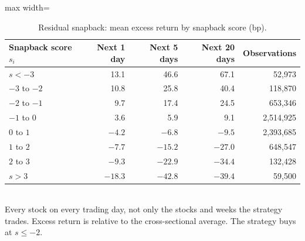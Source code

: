 \documentclass[11pt,letterpaper]{article}
\begin{document}
\begin{table}[!htbp]
    \centering
    \caption{Residual snapback: mean excess return by snapback score (bp).}
    \label{tab:calibration-snap}
    \begin{adjustbox}{max width=\linewidth}
        \begin{tabular}{lrrrr}
            \toprule
            Snapback score $s_i$ & Next 1 day & Next 5 days & Next 20 days & Observations \\
            \midrule
            $s < -3$ & 13.1 & 46.6 & 67.1 & 52,973 \\
            $-3$ to $-2$ & 10.8 & 25.8 & 40.4 & 118,870 \\
            $-2$ to $-1$ & 9.7 & 17.4 & 24.5 & 653,346 \\
            $-1$ to $0$ & 3.6 & 5.9 & 9.1 & 2,514,925 \\
            $0$ to $1$ & $-4.2$ & $-6.8$ & $-9.5$ & 2,393,685 \\
            $1$ to $2$ & $-7.7$ & $-15.2$ & $-27.0$ & 648,547 \\
            $2$ to $3$ & $-9.3$ & $-22.9$ & $-34.4$ & 132,428 \\
            $s > 3$ & $-18.3$ & $-42.8$ & $-39.4$ & 59,500 \\
            \bottomrule
        \end{tabular}
    \end{adjustbox}
    \\[4pt]
    \small Every stock on every trading day, not only the stocks and weeks the strategy trades.
    Excess return is relative to the cross-sectional average. The strategy buys at $s \le -2$.
\end{table}
\end{document}

